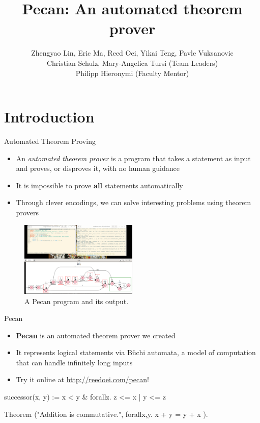 \documentclass[leqno,presentation,usenames,dvipsnames]{beamer}
\title{Pecan: An automated theorem prover}
\author[names]{Zhengyao Lin, Eric Ma, Reed Oei, Yikai Teng, Pavle Vuksanovic \\ Christian Schulz, Mary-Angelica Tursi (Team Leaders) \\ Philipp Hieronymi (Faculty Mentor)}
\institute{University of Illinois at Urbana-Champaign}
\date{}
\begin{document}
\frame{\titlepage}

\section{Introduction}

\begin{frame}{Automated Theorem Proving}
    \begin{itemize}
        \item An \emph{automated theorem prover} is a program that takes a statement as input and proves, or disproves it, with no human guidance
            
        \item It is impossible to prove \textbf{all} statements automatically
        
        \item Through clever encodings, we can solve interesting problems using theorem provers
    \end{itemize}
    
    \begin{figure}
        \centering
        \includegraphics[width=0.5\textwidth]{images/pecan-demo-sp2020.png}
        \caption{A Pecan program and its output.}
        \label{fig:pecan-ex}
    \end{figure}
\end{frame}

\begin{frame}[fragile]{Pecan}
\begin{itemize}
    \item \textbf{Pecan} is an automated theorem prover we created
    \item It represents logical statements via B\"uchi automata, a model of computation that can handle infinitely long inputs
    \item Try it online at \url{http://reedoei.com/pecan}!
\end{itemize}
    
\begin{pecan}
successor(x, y) := x < y & forallz. z <= x | y <= z

Theorem ("Addition is commutative.", { 
    forallx,y. x + y = y + x 
}).
\end{pecan}
\end{frame}
\end{document}
